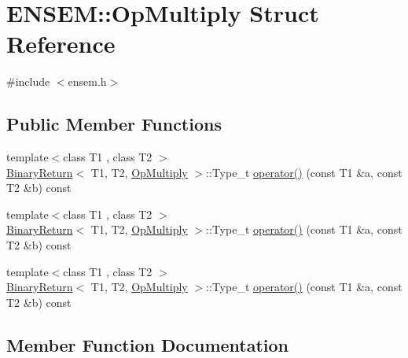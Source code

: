 \hypertarget{structENSEM_1_1OpMultiply}{}\section{E\+N\+S\+EM\+:\+:Op\+Multiply Struct Reference}
\label{structENSEM_1_1OpMultiply}


{\ttfamily \#include $<$ensem.\+h$>$}

\subsection*{Public Member Functions}
\begin{DoxyCompactItemize}
\item 
{\footnotesize template$<$class T1 , class T2 $>$ }\\\mbox{\hyperlink{structENSEM_1_1BinaryReturn}{Binary\+Return}}$<$ T1, T2, \mbox{\hyperlink{structENSEM_1_1OpMultiply}{Op\+Multiply}} $>$\+::Type\+\_\+t \mbox{\hyperlink{structENSEM_1_1OpMultiply_ae4e6438a01cae970041fa80c1cb6b594}{operator()}} (const T1 \&a, const T2 \&b) const
\item 
{\footnotesize template$<$class T1 , class T2 $>$ }\\\mbox{\hyperlink{structENSEM_1_1BinaryReturn}{Binary\+Return}}$<$ T1, T2, \mbox{\hyperlink{structENSEM_1_1OpMultiply}{Op\+Multiply}} $>$\+::Type\+\_\+t \mbox{\hyperlink{structENSEM_1_1OpMultiply_ae4e6438a01cae970041fa80c1cb6b594}{operator()}} (const T1 \&a, const T2 \&b) const
\item 
{\footnotesize template$<$class T1 , class T2 $>$ }\\\mbox{\hyperlink{structENSEM_1_1BinaryReturn}{Binary\+Return}}$<$ T1, T2, \mbox{\hyperlink{structENSEM_1_1OpMultiply}{Op\+Multiply}} $>$\+::Type\+\_\+t \mbox{\hyperlink{structENSEM_1_1OpMultiply_ae4e6438a01cae970041fa80c1cb6b594}{operator()}} (const T1 \&a, const T2 \&b) const
\end{DoxyCompactItemize}


\subsection{Member Function Documentation}
\mbox{\label{structENSEM_1_1OpMultiply_ae4e6438a01cae970041fa80c1cb6b594}} 
